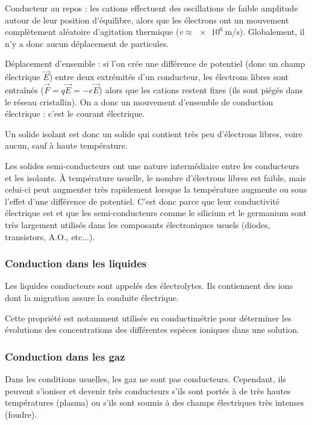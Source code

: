 Conducteur au repos : les cations effectuent des oscillations de faible amplitude autour de leur position d'équilibre, alors que les électrons ont un mouvement complètement aléatoire d'agitation thermique (\(v\approx\SI{e6}{\metre\per\second}\)). Globalement, il n'y a donc aucun déplacement de particules.

Déplacement d'ensemble : si l'on crée une différence de potentiel (donc un champ électrique \(\vec{E}\)) entre deux extrémités d'un conducteur, les électrons libres sont entraînés (\(\vec{F}=q\vec{E}=-e\vec{E}\)) alors que les cations restent fixes (ils sont piégés dans le réseau cristallin). On a donc un mouvement d'ensemble de conduction électrique : c'est le courant électrique.

Un solide isolant est donc un solide qui contient très peu d'électrons libres, voire aucun, sauf à haute température.

Les solides semi-conducteurs ont une nature intermédiaire entre les conducteurs et les isolants. À température usuelle, le nombre d'électrons libres est faible, mais celui-ci peut augmenter très rapidement lorsque la température augmente ou sous l'effet d'une différence de potentiel. C'est donc parce que leur conductivité électrique est  et  que les semi-conducteurs comme le silicium et le germanium sont très largement utilisés dans les composants électroniques usuels (diodes, transistors, A.O., etc...).

\subsubsection{Conduction dans les liquides}

Les liquides conducteurs sont appelés des électrolytes. Ils contiennent des ions dont la migration assure la conduite électrique.

Cette propriété est notamment utilisée en conductimétrie pour déterminer les évolutions des concentrations des différentes espèces ioniques dans une solution.

\subsubsection{Conduction dans les gaz}

Dans les conditions usuelles, les gaz ne sont pas conducteurs. Cependant, ils peuvent s'ioniser et devenir très conducteurs s'ils sont portés à de très hautes températures (plasma) ou s'ils sont soumis à des champs électriques très intenses (foudre).

